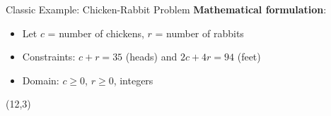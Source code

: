 \documentclass{beamer}
\begin{document}
\begin{frame}[t]{Classic Example: Chicken-Rabbit Problem}
\textbf{Mathematical formulation}:
\begin{itemize}
\item Let $c$ = number of chickens, $r$ = number of rabbits
\item Constraints: $c + r = 35$ (heads) and $2c + 4r = 94$ (feet)
\item Domain: $c \geq 0$, $r \geq 0$, integers
\end{itemize}
    \begin{textblock}{3}(12,3)
    \end{textblock}

\end{frame}
\end{document}
